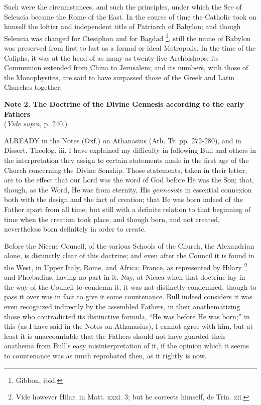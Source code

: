 Such were the circumstances, and such the principles, under which
the See of Seleucia became the Rome of the East. In the course of time
the Catholic took on himself the loftier and independent title of
Patriarch of Babylon; and though Seleucia was changed for Ctesiphon
and for Bagdad \footnote{Gibbon, ibid.}, still
the name of Babylon was preserved from first to last as a formal or
ideal Metropolis. In the time of the Caliphs, it was at the head of as
many as twenty-five Archbishops; its Communion extended from China to
Jerusalem; and its numbers, with those of the Monophysites, are said
to have surpassed those of the Greek and Latin Churches together.

\textbf{Note 2. The Doctrine of the Divine Gennesis
according to the early Fathers}\\
(\emph{Vide supra}, p. 240.)

ALREADY in the Notes (Oxf.) on
Athanasius (Ath. Tr. pp. 272-280), and in Dissert. Theolog. iii. I
have explained my difficulty in following Bull and others in the
interpretation they assign to certain statements made in the first age
of the Church concerning the Divine Sonship. Those statements, taken
in their letter, are to the effect that our Lord was the word of God
before He was the Son; that, though, as the Word, He was from
eternity, His \emph{gennesis}is in essential connexion both with the
design and the fact of creation; that He was born indeed of the Father
apart from all time, but still with a definite relation to that
beginning of time when the creation took place, and though born, and
not created, nevertheless born definitely in order to create.

Before the Nicene Council, of the various Schools of the Church,
the Alexandrian alone, is distinctly clear of this doctrine; and even
after the Council it is found in the West, in Upper Italy, Rome, and
Africa; France, as represented by Hilary \footnote{Vide however Hilar. in Matt. xxxi. 3; but he corrects himself,
de Trin. xii.} and Phœbadius, having no part in it. Nay, at Nicæa when that
doctrine lay in the way of the Council to condemn it, it was not
distinctly condemned, though to pass it over was in fact to give it
some countenance. Bull indeed considers it was even recognized
indirectly by the assembled Fathers, in their anathematizing those who
contradicted its distinctive formula, ``He was before He was
born;'' in this (as I have said in the Notes on Athanasius),
I cannot agree with him, but at least it is unaccountable that the
Fathers should not have guarded their anathema from Bull's easy
misinterpretation of it, if the opinion which it seems to countenance
was as much reprobated then, as it rightly is now.


